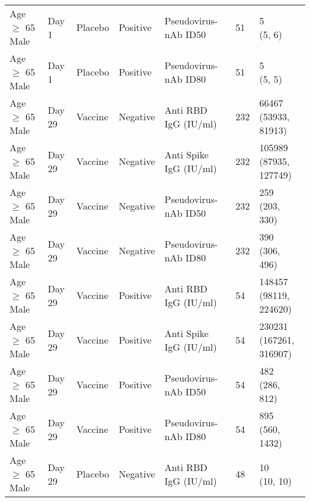 \documentclass[]{book}
\theoremstyle{definition}
\theoremstyle{definition}
\theoremstyle{definition}
\newcommand{\1}{\mathbbm{1}}
\begin{document}
\begin{landscape}
\begin{ThreePartTable}
\begin{longtable}[t]{>{\raggedright\arraybackslash}p{7cm}llllll}
\hspace{1em}Age $\geq$ 65 Male & Day 1 & Placebo & Positive & Pseudovirus-nAb ID50 & 51 & \makecell[l]{5\\(5, 6)}\\
\hspace{1em}Age $\geq$ 65 Male & Day 1 & Placebo & Positive & Pseudovirus-nAb ID80 & 51 & \makecell[l]{5\\(5, 5)}\\
\hspace{1em}Age $\geq$ 65 Male & Day 29 & Vaccine & Negative & Anti RBD IgG (IU/ml) & 232 & \makecell[l]{66467\\(53933, 81913)}\\
\hspace{1em}Age $\geq$ 65 Male & Day 29 & Vaccine & Negative & Anti Spike IgG (IU/ml) & 232 & \makecell[l]{105989\\(87935, 127749)}\\
\hspace{1em}Age $\geq$ 65 Male & Day 29 & Vaccine & Negative & Pseudovirus-nAb ID50 & 232 & \makecell[l]{259\\(203, 330)}\\
\hspace{1em}Age $\geq$ 65 Male & Day 29 & Vaccine & Negative & Pseudovirus-nAb ID80 & 232 & \makecell[l]{390\\(306, 496)}\\
\hspace{1em}Age $\geq$ 65 Male & Day 29 & Vaccine & Positive & Anti RBD IgG (IU/ml) & 54 & \makecell[l]{148457\\(98119, 224620)}\\
\hspace{1em}Age $\geq$ 65 Male & Day 29 & Vaccine & Positive & Anti Spike IgG (IU/ml) & 54 & \makecell[l]{230231\\(167261, 316907)}\\
\hspace{1em}Age $\geq$ 65 Male & Day 29 & Vaccine & Positive & Pseudovirus-nAb ID50 & 54 & \makecell[l]{482\\(286, 812)}\\
\hspace{1em}Age $\geq$ 65 Male & Day 29 & Vaccine & Positive & Pseudovirus-nAb ID80 & 54 & \makecell[l]{895\\(560, 1432)}\\
\hspace{1em}Age $\geq$ 65 Male & Day 29 & Placebo & Negative & Anti RBD IgG (IU/ml) & 48 & \makecell[l]{10\\(10, 10)}\\

\end{longtable}
\end{ThreePartTable}
\end{landscape}
\end{document}
